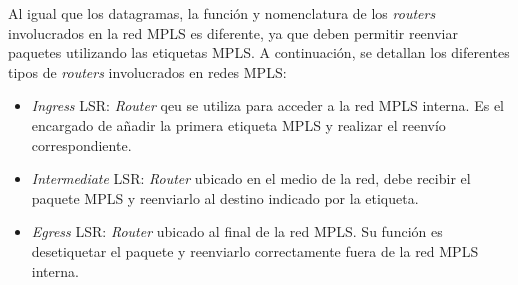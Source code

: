 		Al igual que los datagramas, la función y nomenclatura de los \textit{routers} involucrados en la red MPLS es diferente, ya que deben permitir reenviar paquetes utilizando las etiquetas MPLS. A continuación, se detallan los diferentes tipos de \textit{routers} involucrados en redes MPLS:
		\begin{itemize}
		    \item \textit{Ingress} LSR: \textit{Router} qeu se utiliza para acceder a la red MPLS interna. Es el encargado de añadir la primera etiqueta MPLS y realizar el reenvío correspondiente.
		    \item \textit{Intermediate} LSR: \textit{Router} ubicado en el medio de la red, debe recibir el paquete MPLS y reenviarlo al destino indicado por la etiqueta.
		    \item \textit{Egress} LSR: \textit{Router} ubicado al final de la red MPLS. Su función es desetiquetar el paquete y reenviarlo correctamente fuera de la red MPLS interna.
		\end{itemize}
		
